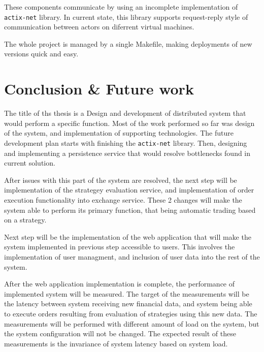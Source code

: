 These components communicate by using an incomplete implementation of \verb|actix-net| library. In current state, this library supports
request-reply style of communication between actors on diferrent virtual machines.

The whole project is managed by a single Makefile, making deployments of new versions quick and easy.

\chapter{Conclusion \& Future work}
The title of ths thesis is a Design and development of distributed system that would perform a specific function.
Most of the work performed so far was design of the system, and implementation of supporting technologies. The
future development plan starts with finishing the \verb|actix-net| library. Then, designing and implementing a persistence
service that would resolve bottlenecks found in current solution.

After issues with this part of the system are resolved, the next step will be implementation of the strategey evaluation service,
and implementation of order execution functionality into exchange service. These 2 changes will make the system able to perform its
primary function, that being automatic trading based on a strategy.

Next step  will be the implementation
of the web application that will make the system implemented in previous step accessible to users. This involves the implementation of user managment,
and inclusion of user data into the rest of the system.

After the web application implementation is complete, the performance of implemented system will be measured. The target of the measurements
will be the latency between system receiving new financial data, and system being able to  execute orders resulting from
evaluation of strategies using this new data. The measurements will be performed with different amount of
load on the system, but the system configuration will not be changed. The expected result of these measurements is the
invariance of system latency based on system load.



